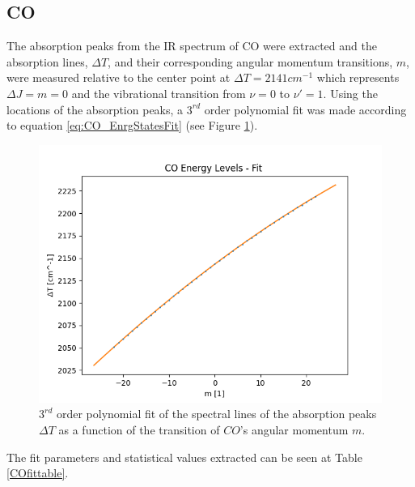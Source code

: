 \documentclass[reprint,amsmath,amssymb,aps, prl,superscriptaddress]{revtex4-2}
\begin{document}
\subsection{CO}
The absorption peaks from the IR spectrum of CO were extracted and the absorption lines,
$\Delta T$, 
and their corresponding angular momentum transitions,
$m$,
were measured relative to the center point at $\Delta T=2141 cm^{-1}$ which represents $\Delta J = m = 0 $ and the vibrational transition from $\nu =0$ to $\nu' =1$. Using the locations of the absorption peaks,
a $3^{rd}$ order polynomial fit was made according to equation \ref{eq:CO_EnrgStatesFit} (see Figure \ref{fig:COPolynomialfit}).
\begin{figure}[H]
    \includegraphics[width=\linewidth]{Images/polynomial_3_fitting.png}
    \caption{$3^{rd}$ order polynomial fit of the spectral lines of the absorption peaks $\Delta T$ as a function of the transition of $CO$'s
    angular momentum $m$. }
    \label{fig:COPolynomialfit}
    \centering
\end{figure}
The fit parameters and statistical values extracted can be seen at Table \ref{COfittable}. 
\end{document}
